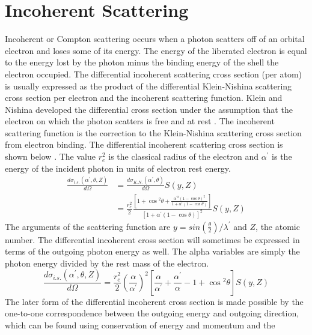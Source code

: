\section{Incoherent Scattering}
Incoherent or Compton scattering occurs when a photon scatters off of an orbital
electron and loses some of its energy. The energy of the liberated electron
is equal to the energy lost by the photon minus the binding energy of the
shell the electron occupied. The differential incoherent scattering cross
section (per atom) is usually expressed as the product of the differential 
Klein-Nishina scattering cross section per electron and the incoherent 
scattering function. Klein and Nishina developed the differential cross section
under the assumption that the electron on which the photon scatters is free 
and at rest \citep{klein_uber_1929}. The incoherent scattering function is the 
correction to the Klein-Nishina scattering cross section from electron binding. 
The differential incoherent scattering cross section is shown below 
\citep{lux_monte_1991}. The value $r_e^2$ is the classical radius of the 
electron and $\alpha^{'}$ is the energy of the incident photon in units of 
electron rest energy.
\begin{align}
  \frac{d\sigma_{i.s.}(\alpha^{'},\theta,Z)}{d\Omega} & = 
  \frac{d\sigma_{K.N.}(\alpha^{'},\theta)}{d\Omega}S(y,Z) \nonumber \\
  & = \frac{r_e^2}{2}
  \frac{\left[1 + \cos{^{2}\theta} + \frac{\alpha^{'2}(1-\cos{\theta})^2}
                                  {1 + \alpha^{'}(1-\cos{\theta})}\right] }
  {\left[1 + \alpha^{'}(1-\cos{\theta}) \right]^2}
  S(y,Z)
  \label{eq:incoh_scat_theta}
\end{align}
The arguments of the scattering function are 
$y = sin(\frac{\theta}{2})/\lambda^{'}$ and $Z$, the atomic number. The 
differential incoherent cross section will sometimes be expressed in terms of 
the outgoing photon energy as well. The alpha variables are simply the photon
energy divided by the rest mass of the electron.
\begin{equation}
  \frac{d\sigma_{i.s.}(\alpha^{'},\theta,Z)}{d\Omega} = \frac{r_e^2}{2}
  \left(\frac{\alpha}{\alpha^{'}} \right)^2
  \left[ \frac{\alpha}{\alpha^{'}} + \frac{\alpha^{'}}{\alpha} - 1 + 
    \cos{^2\theta} \right] S(y,Z)
\end{equation}
The later form of the differential incoherent cross section is made possible 
by the one-to-one correspondence between the outgoing energy and outgoing 
direction, which can be found using conservation of energy and momentum and the 
